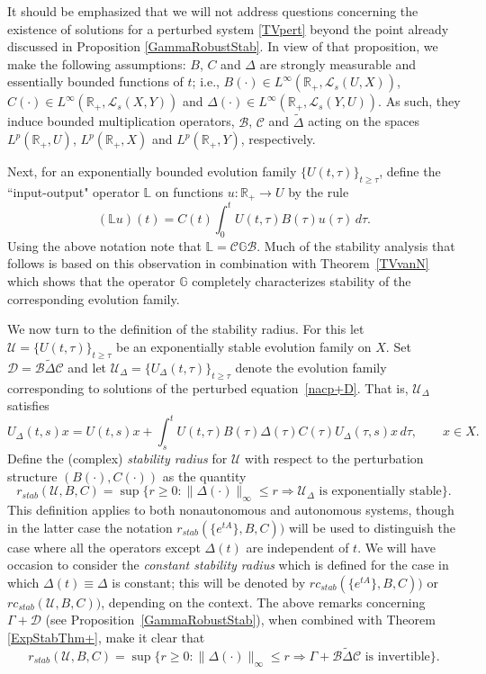 \documentclass[10pt,psamsfonts,leqno]{siamltex}
\newcommand{\bbR}{\mathbb{R}}
\newcommand{\bbL}{\mathbb{L}}
\newcommand{\bbG}{\mathbb{G}}
\renewcommand{\t}{\tau}
\newcommand{\U}{\mathcal{U}}
\newcommand{\rstab}{r_{stab}}
\begin{document}
It should be emphasized that we will not address questions concerning
the existence of solutions for a perturbed system \eqref{TVpert} beyond
the point already discussed in Proposition \ref{GammaRobustStab}.  In
view of that proposition, we make the following assumptions:
$B$, $C$ and $\Delta$  are strongly measurable and essentially
bounded functions of $t$; i.e.,
$B(\cdot)\in L^\infty(\bbR_+,\mathcal{L}_s(U,X))$,
$C(\cdot)\in L^\infty(\bbR_+,\mathcal{L}_s(X,Y))$ and
$\Delta(\cdot)\in L^\infty(\bbR_+,\mathcal{L}_s(Y,U))$.  As such, they
induce bounded multiplication operators,
$\mathcal{B}$, $\mathcal{C}$ and $\tilde{\Delta}$ acting on the spaces
$L^p(\bbR_+,U)$, $L^p(\bbR_+,X)$ and $L^p(\bbR_+,Y)$,
respectively.

Next, for an exponentially bounded evolution family
$\{U(t,\tau)\}_{t\ge\tau}$, define the ``input-output" operator
$\bbL$ on functions $u:\bbR_+\to U$ by the rule
\[
(\bbL u)(t)=C(t)\int_0^t U(t,\t)B(\t)u(\t)\, d\t.
\]
Using the above notation note that $\bbL=\mathcal{C}\bbG\mathcal{B}$.
Much of the stability analysis that follows is based on this observation
in combination with Theorem~\ref{TVvanN} which shows that  the operator
$\bbG$ completely characterizes stability of the corresponding
evolution
family.

We now turn to the definition of the stability radius.
For this let  $\U=\{U(t,\tau)\}_{t\ge\tau}$ be an exponentially stable
evolution family on $X$.
Set $\mathcal{D}=\mathcal{B}\tilde{\Delta}\mathcal{C}$ and let
$\U_\Delta=\{U_\Delta(t,\tau)\}_{t\ge\tau}$ denote  the evolution
family corresponding to solutions of the perturbed
equation~\eqref{nacp+D}.  That is, $\U_\Delta$ satisfies
\begin{equation*}
U_\Delta(t,s)x=U(t,s)x+
\int_s^tU(t,\tau)B(\tau)\Delta(\tau)C(\tau)U_\Delta(\tau,s)x\,d\tau,
\qquad x\in X.
\end{equation*}
Define the (complex) {\em stability radius} for
$\U$ with respect to the perturbation structure
$(B(\cdot),C(\cdot))$ as the quantity
$$
\rstab(\U,B,C)=\sup\{r\ge0:\|\Delta(\cdot)\|_\infty\le r\Rightarrow
\U_\Delta\mbox{ is exponentially stable} \}.
$$
This definition applies to both nonautonomous and autonomous systems,
though in the latter case the notation $\rstab(\{e^{tA}\},B,C))$ will be
used to distinguish the case where all the operators except $\Delta(t)$
are independent of $t$.  We will have occasion to consider the
{\em constant stability radius} which is defined for the case in which
$\Delta(t)\equiv \Delta$ is constant; this will be denoted by
$rc_{stab}(\{e^{tA}\},B,C))$
or $rc_{stab}(\U,B,C))$, depending on the context.
The above remarks concerning $\Gamma+\mathcal{D}$ (see
Proposition~\ref{GammaRobustStab}), when combined with
Theorem \ref{ExpStabThm+}, make it clear  that
\begin{equation}\label{rstabGamma}
\rstab(\U,B,C)=\sup\{r\ge0:\|\Delta(\cdot)\|_\infty\le r\Rightarrow
\Gamma+\mathcal{B}\tilde{\Delta}\mathcal{C}\mbox{ is invertible} \}.
\end{equation}
\end{document}
